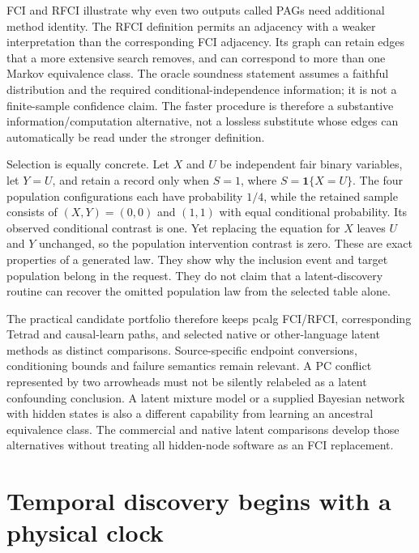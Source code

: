 FCI and RFCI illustrate why even two outputs called PAGs need additional
method identity. The RFCI definition permits an adjacency with a weaker
interpretation than the corresponding FCI adjacency. Its graph can retain
edges that a more extensive search removes, and can correspond to more than
one Markov equivalence class. The oracle soundness statement assumes a
faithful distribution and the required conditional-independence information;
it is not a finite-sample confidence claim. The faster procedure is therefore
a substantive information/computation alternative, not a lossless substitute
whose edges can automatically be read under the stronger definition.
\citep{exec13_latentr_colombo2012}

Selection is equally concrete. Let $X$ and $U$ be independent fair binary
variables, let $Y=U$, and retain a record only when $S=1$, where
$S=\mathbf1\{X=U\}$. The four population configurations each have probability
$1/4$, while the retained sample consists of $(X,Y)=(0,0)$ and $(1,1)$ with
equal conditional probability. Its observed conditional contrast is one.
Yet replacing the equation for $X$ leaves $U$ and $Y$ unchanged, so the
population intervention contrast is zero. These are exact properties of a
generated law. They show why the inclusion event and target population belong
in the request. They do not claim that a latent-discovery routine can recover
the omitted population law from the selected table alone.
\citep{exec16_s2_exact}

The practical candidate portfolio therefore keeps pcalg FCI/RFCI, corresponding
Tetrad and causal-learn paths, and selected native or other-language latent
methods as distinct comparisons. Source-specific endpoint conversions,
conditioning bounds and failure semantics remain relevant. A PC conflict
represented by two arrowheads must not be silently relabeled as a latent
confounding conclusion. A latent mixture model or a supplied Bayesian network
with hidden states is also a different capability from learning an ancestral
equivalence class. The commercial and native latent comparisons develop
those alternatives without treating all hidden-node software as an FCI
replacement. \citep{exec13_pydisc_causallearn,exec13_latentr_primary,exec14_native_agrum,exec14_native_miic,exec13_latent_genie_structure,exec13_latent_mplus}

\section{Temporal discovery begins with a physical clock}

